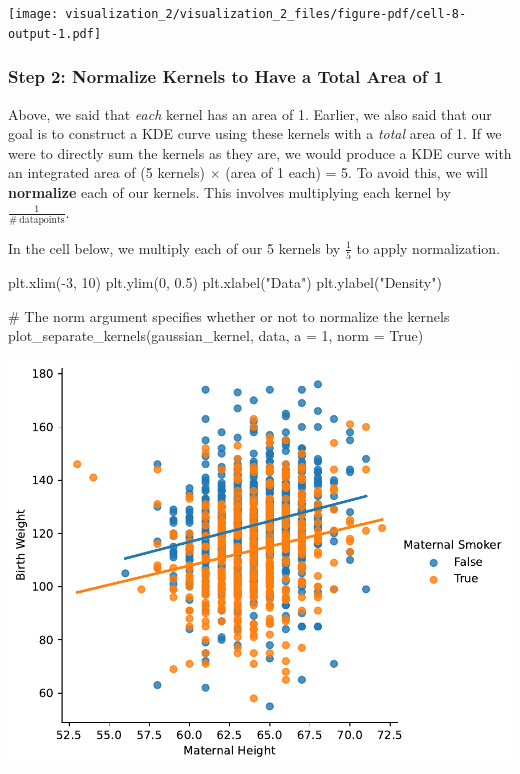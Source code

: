 \documentclass[
  letterpaper,
  DIV=11,
  numbers=noendperiod]{scrreprt}
\newenvironment{Shaded}{\begin{snugshade}}{\end{snugshade}}
\newcommand{\CommentTok}[1]{\textcolor[rgb]{0.37,0.37,0.37}{#1}}
\newcommand{\DecValTok}[1]{\textcolor[rgb]{0.68,0.00,0.00}{#1}}
\newcommand{\FloatTok}[1]{\textcolor[rgb]{0.68,0.00,0.00}{#1}}
\newcommand{\NormalTok}[1]{\textcolor[rgb]{0.00,0.23,0.31}{#1}}
\newcommand{\OperatorTok}[1]{\textcolor[rgb]{0.37,0.37,0.37}{#1}}
\newcommand{\StringTok}[1]{\textcolor[rgb]{0.13,0.47,0.30}{#1}}
\newcommand{\VariableTok}[1]{\textcolor[rgb]{0.07,0.07,0.07}{#1}}
\begin{document}
\texttt{[image: visualization\_2/visualization\_2\_files/figure-pdf/cell-8-output-1.pdf]}

\subsubsection{Step 2: Normalize Kernels to Have a Total Area of
1}\label{step-2-normalize-kernels-to-have-a-total-area-of-1}

Above, we said that \emph{each} kernel has an area of 1. Earlier, we
also said that our goal is to construct a KDE curve using these kernels
with a \emph{total} area of 1. If we were to directly sum the kernels as
they are, we would produce a KDE curve with an integrated area of (5
kernels) \(\times\) (area of 1 each) = 5. To avoid this, we will
\textbf{normalize} each of our kernels. This involves multiplying each
kernel by \(\frac{1}{\#\:\text{datapoints}}\).

In the cell below, we multiply each of our 5 kernels by \(\frac{1}{5}\)
to apply normalization.

\begin{Shaded}
\begin{Highlighting}[]
\NormalTok{plt.xlim(}\OperatorTok{{-}}\DecValTok{3}\NormalTok{, }\DecValTok{10}\NormalTok{)}
\NormalTok{plt.ylim(}\DecValTok{0}\NormalTok{, }\FloatTok{0.5}\NormalTok{)}
\NormalTok{plt.xlabel(}\StringTok{"Data"}\NormalTok{)}
\NormalTok{plt.ylabel(}\StringTok{"Density"}\NormalTok{)}

\CommentTok{\# The \textasciigrave{}norm\textasciigrave{} argument specifies whether or not to normalize the kernels}
\NormalTok{plot\_separate\_kernels(gaussian\_kernel, data, a }\OperatorTok{=} \DecValTok{1}\NormalTok{, norm }\OperatorTok{=} \VariableTok{True}\NormalTok{)}
\end{Highlighting}
\end{Shaded}

\includegraphics{visualization_2/visualization_2_files/figure-pdf/cell-9-output-1.pdf}
\end{document}
